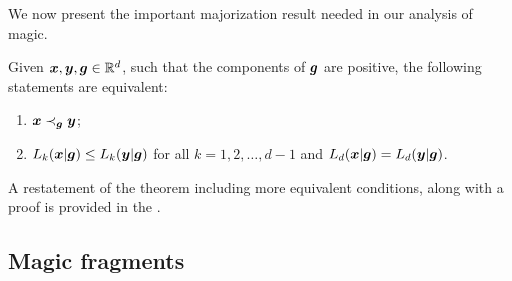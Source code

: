 We now present the important majorization result needed in our analysis of magic.
\begin{theorem}\label{thm:dmajor}
Given $\bm{x}, \bm{y}, \bm{g} \in \mathbb{R}^d$, such that the components of $\bm{g}$ are positive, the following statements are equivalent:
 \begin{enumerate}%
	\item\label{en:tm1} $\bm{x} \prec_{\bm{g}} \bm{y}$;
	\item\label{en:tm5} $L_k(\bm{x}|\bm{g}) \leq L_k(\bm{y}|\bm{g})$ for all $k=1,2,\dots, d-1$ and $L_d(\bm{x}|\bm{g}) = L_d(\bm{y}|\bm{g})$.
 \end{enumerate}
\end{theorem}
A restatement of the theorem including more equivalent conditions, along with a proof is provided in the .

\subsection{Magic fragments}\label{sec:magfrag}

